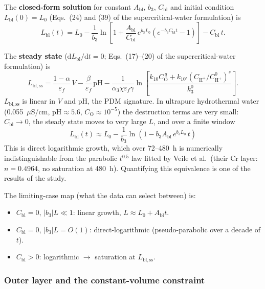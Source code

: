 The \textbf{closed-form solution} for constant $A_{\mathrm{bl}}$, $b_3$,
$C_{\mathrm{bl}}$ and initial condition $L_{\mathrm{bl}}(0) = L_0$
(Eqs.~(24) and (39) of the supercritical-water formulation) is
\begin{equation}
L_{\mathrm{bl}}(t) = L_0 - \frac{1}{b_3}
\ln\!\left[ 1 + \frac{A_{\mathrm{bl}}}{C_{\mathrm{bl}}}\, e^{b_3 L_0}
\left( e^{-b_3 C_{\mathrm{bl}} t} - 1 \right) \right]
- C_{\mathrm{bl}}\, t .
\label{eq:blclosed}
\end{equation}

The \textbf{steady state} ($\mathrm{d}L_{\mathrm{bl}}/\mathrm{d}t = 0$;
Eqs.~(17)--(20) of the supercritical-water formulation) is
\begin{equation}
L_{\mathrm{bl,ss}} = \frac{1-\alpha}{\varepsilon_f}\, V
- \frac{\beta}{\varepsilon_f}\, \mathrm{pH}
- \frac{1}{\alpha_3 \chi \varepsilon_f \gamma}
\ln\!\left[ \frac{ k_{10} C_{\mathrm{O}}^{\,q}
+ k_{10'} \left( C_{\mathrm{H^+}}/C^0_{\mathrm{H^+}} \right)^{s} }{ k_3^{0} } \right] .
\end{equation}
$L_{\mathrm{bl,ss}}$ is linear in $V$ and pH, the PDM signature. In
ultrapure hydrothermal water (0.055~$\mu$S/cm, $\mathrm{pH} \approx 5.6$,
$C_{\mathrm{O}} \approx 10^{-5}$) the destruction terms are very small:
$C_{\mathrm{bl}} \to 0$, the steady state moves to very large $L$, and over a
finite window
\begin{equation}
L_{\mathrm{bl}}(t) \approx L_0 - \frac{1}{b_3}
\ln\!\left( 1 - b_3 A_{\mathrm{bl}}\, e^{b_3 L_0}\, t \right)
\end{equation}
This is direct logarithmic growth, which over 72--480~h is numerically
indistinguishable from the parabolic $t^{0.5}$ law fitted by Veile et al.\
(their Cr layer: $n = 0.4964$, no saturation at 480~h). Quantifying this
equivalence is one of the results of the study.

The limiting-case map (what the data can select between) is:
\begin{itemize}
\item $C_{\mathrm{bl}} = 0$, $|b_3| L \ll 1$: linear growth,
$L \approx L_0 + A_{\mathrm{bl}} t$.
\item $C_{\mathrm{bl}} = 0$, $|b_3| L = O(1)$: direct-logarithmic
(pseudo-parabolic over a decade of $t$).
\item $C_{\mathrm{bl}} > 0$: logarithmic $\to$ saturation at
$L_{\mathrm{bl,ss}}$.
\end{itemize}

\subsubsection{Outer layer and the constant-volume constraint}

